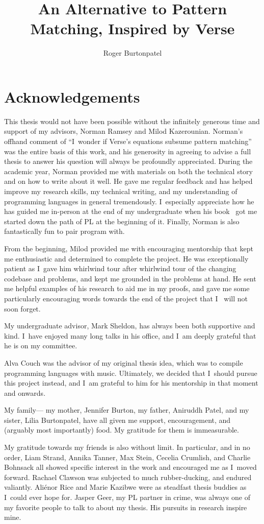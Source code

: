 \documentclass[manuscript,screen,review, 12pt, nonacm]{acmart}
\title{An Alternative to Pattern Matching, Inspired by Verse}
\author{Roger Burtonpatel}
\affiliation{%
\institution{Tufts University}
\streetaddress{419 Boston Ave}
  \city{Medford}
  \state{Massachusetts}
  \country{USA}
  \postcode{02155}
  }
\begin{document}
\section{Acknowledgements}

This thesis would not have been possible without the infinitely generous time
and support of my advisors, Norman Ramsey and Milod Kazerounian. Norman's
offhand comment of “I~wonder if Verse's equations subsume pattern matching” was
the entire basis of this work, and his generosity in agreeing to advise a full
thesis to answer his question will always be profoundly appreciated. During the
academic year, Norman provided me with materials on both the technical story and
on how to write about it well. He gave me regular feedback and has helped
improve my research skills, my technical writing, and my understanding of
programming languages in general tremendously. I~especially appreciate how he
has guided me in-person at the end of my undergraduate when his book~\citep{bpc}
got me started down the path of PL at the beginning of it. Finally, Norman is
also fantastically fun to pair program with. 

From the beginning, Milod provided me with encouraging mentorship that kept
me enthusiastic and determined to complete the project. He was exceptionally
patient as I~gave him whirlwind tour after whirlwind tour of the changing
codebase and problems, and kept me grounded in the problems at hand. He 
sent me helpful examples of his research to aid me in my proofs, and gave me
some particularly encouraging words towards the end of the project that I~
will not soon forget. 

My undergraduate advisor, Mark Sheldon, has always been both supportive and
kind. I~have enjoyed many long talks in his office, and I~am deeply grateful
that he is on my committee. 

Alva Couch was the advisor of my original thesis idea, which was to compile
programming languages with music. Ultimately, we decided that I~should pursue
this project instead, and I~am grateful to him for his mentorship in that moment
and onwards. 

My family--- my mother, Jennifer Burton, my father, Aniruddh Patel, and my
sister, Lilia Burtonpatel, have all given me support, encouragement, and
(arguably most importantly) food. My gratitude for them is immeasurable. 

My gratitude towards my friends is also without limit. In particular, and in
no order, Liam Strand, Annika Tanner, Max Stein, Cecelia Crumlish, and
Charlie Bohnsack all showed specific interest in the work and encouraged me
as I~moved forward. Rachael Clawson was subjected to much rubber-ducking,
and endured valiantly. Aliénor Rice and Marie Kazibwe were as steadfast
thesis buddies as I~could ever hope for. Jasper Geer, my PL partner in
crime, was always one of my favorite people to talk to about my thesis. His
pursuits in research inspire mine. 
\end{document}
